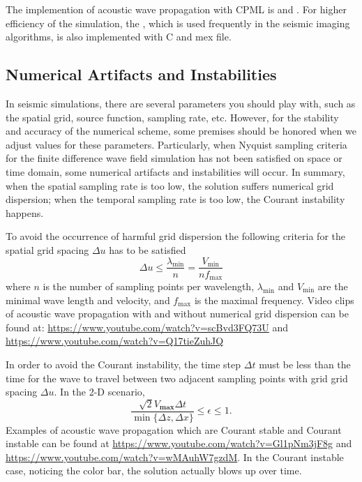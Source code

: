\documentclass[11pt]{article}
\theoremstyle{plain}
\theoremstyle{definition}
\theoremstyle{remark}
\numberwithin{equation}{section}
\begin{document}
The implemention of acoustic wave propagation with CPML is  and .
For higher efficiency of the simulation, the , which is used frequently in the seismic imaging algorithms, is also implemented with C and mex file. 

\subsection{Numerical Artifacts and Instabilities}
In seismic simulations, there are several parameters you should play with, such as the spatial grid, source function, sampling rate, etc. However, 
for the stability and accuracy of the numerical scheme, some premises should be honored when we adjust values for these parameters.  
Particularly, when Nyquist sampling criteria for the finite difference wave field simulation has not been satisfied on space or time domain, some numerical artifacts and instabilities will occur. In summary, when the spatial sampling rate is too low,  the solution suffers numerical grid dispersion; when the temporal sampling rate is too low, the Courant instability happens.

To avoid the occurrence of harmful grid dispersion the following criteria for the spatial grid spacing $\Delta u$ has to be satisfied
\begin{equation}
  \Delta u \leq \frac{\lambda_{\min}}{n} = \frac{V_{\min}}{nf_{\max}}
\end{equation}
where $n$ is the number of sampling points per wavelength, $\lambda_{\min}$ and $V_{\min}$ are the minimal wave length and velocity, and $f_{\max}$ is the maximal frequency. 
Video clips of acoustic wave propagation with and without numerical grid dispersion can be found at:
\url{https://www.youtube.com/watch?v=scBvd3FQ73U} and \url{https://www.youtube.com/watch?v=Q17tieZuhJQ}

In order to avoid the Courant instability, the time step $\Delta t$ must be less than the time for the wave to travel between two 
adjacent sampling points with grid grid spacing $\Delta u$. In the 2-D scenario,
\begin{equation}
\frac{\sqrt{2}V_{\textbf{max}}\Delta t}{\min\{\Delta z, \Delta x\}}\le \epsilon \le 1.
\end{equation}
Examples of acoustic wave propagation which are Courant stable and Courant instable can be found at
\url{https://www.youtube.com/watch?v=Gl1pNm3jF8g}  and \url{https://www.youtube.com/watch?v=wMAuhW7gzdM}. 
In the Courant instable case, noticing the color bar, the solution actually blows up over time.
\end{document}
